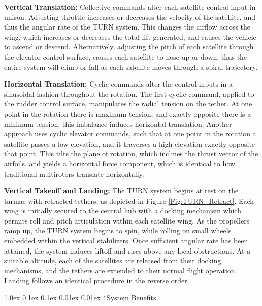 \documentclass[11pt]{article}
\makeatletter
\renewcommand\subsection{
\@startsection{subsection}{2}{\z@}%
{1.0ex \@plus 0.1ex \@minus 0.1ex}%
{0.01ex \@plus 0.01ex}%
{\normalfont\Large\bfseries}}
\makeatother
\begin{document}
{\bf Vertical Translation:}
Collective commands alter each satellite control input in unison.  Adjusting throttle increases or decreases the velocity of the satellite, and thus the angular rate of the TURN system.  This changes the airflow across the wing, which increases or decreases the total lift generated, and causes the vehicle to ascend or descend.  Alternatively, adjusting the pitch of each satellite through the elevator control surface, causes each satellite to nose up or down, thus the entire system will climb or fall as each satellite moves through a spiral trajectory.


{\bf Horizontal Translation:}
Cyclic commands alter the control inputs in a sinusoidal fashion throughout the rotation.  The first cyclic command, applied to the rudder control surface, manipulates the radial tension on the tether.  At one point in the rotation there is maximum tension, and exactly opposite there is a minimum tension; this imbalance induces horizontal translation.  Another approach uses cyclic elevator commands, such that at one point in the rotation a satellite passes a low elevation, and it traverses a high elevation exactly opposite that point. This tilts the plane of rotation, which inclines the thrust vector of the airfoils, and yields a horizontal force component, which is identical to how traditional multirotors translate horizontally.


{\bf Vertical Takeoff and Landing:}
The TURN system begins at rest on the tarmac with retracted tethers, as depicted in Figure \ref{Fig:TURN_Retract}.  Each wing is initially secured to the central hub with a docking mechanism which permits roll and pitch articulation within each satellite wing.  As the propellers ramp up, the TURN system begins to spin, while rolling on small wheels embedded within the vertical stabilizers.  Once sufficient angular rate has been attained, the system induces liftoff and rises above any local obstructions.  At a suitable altitude, each of the satellites are released from their docking mechanisms, and the tethers are extended to their normal flight operation.  Landing follows an identical procedure in the reverse order.




\subsection*{System Benefits}
\end{document}
